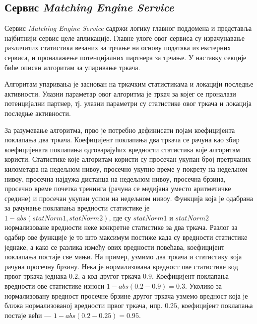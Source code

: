 \documentclass[12pt,oneside]{memoir}
\begin{document}
\subsection{Сервис \textit{Matching Engine Service}}
Сервис \textit{Matching Engine Service} садржи логику главног поддомена и представља најбитнији сервис целе апликације. Главне улоге овог сервиса су израчунавање различитих статистика везаних за трчање на основу података из екстерних сервиса, и проналажење потенцијалних партнера за трчање. У наставку секције биће описан алгоритам за упаривање тркача.

Алгоритам упаривања је заснован на тркачким статистикама и локацији последње активности. Улазни параметар овог алгоритма је тркач за којег се проналази потенцијални партнер, тј. улазни параметри су статистике овог тркача и локација последње активности.

За разумевање алгоритма, прво је потребно дефинисати појам коефицијента поклапања два тркача. Коефицијент поклапања два тркача се рачуна као збир коефицијената поклапања одговарајућих вредности статистика које алгоритам користи. Статистике које алгоритам користи су просечан укупан број претрчаних километара на недељном нивоу, просечно укупно време у покрету на недељном нивоу, просечна најдужа дистанца на недељном нивоу, просечна брзина, просечно време почетка тренинга (рачуна се медијана уместо аритметичке средине) и просечан укупан успон на недељном нивоу. Функција која је одабрана за рачунање поклапања вредности статистике је $1 - abs(statNorm1, statNorm2)$, где су $statNorm1$ и $statNorm2$ нормализоване вредности неке конкретне статистике за два тркача. Разлог за одабир ове функције је то што максимум постиже када су вредности статистике једнаке, а како се разлика између ових вредности повећава, коефицијент поклапања постаје све мањи. На пример, узмимо два тркача и статистику која рачуна просечну брзину. Нека је нормализована вредност ове статистике код првог тркача једнака $0.2$, а код другог тркача $0.9$. Коефицијент поклапања вредности ове статистике износи $1 - abs(0.2 - 0.9) = 0.3$. Уколико за нормализовану вредност просечне брзине другог тркача узмемо вредност која је ближа нормализованој вредности првог тркача, нпр. $0.25$, коефицијент поклапања постаје већи --- $1 - abs(0.2 - 0.25) = 0.95$.
\end{document}
